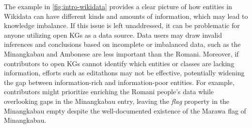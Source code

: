 The example in \autoref{fig:intro-wikidata} provides a clear picture of how entities in Wikidata can have different kinds and amounts of information, which may lead to knowledge imbalance. If this issue is left unaddressed, it can be problematic for anyone utilizing open KGs as a data source. Data users may draw invalid inferences and conclusions based on incomplete or imbalanced data, such as the Minangkabau and Ambonese are less important than the Romani. Moreover, if contributors to open KGs cannot identify which entities or classes are lacking information, efforts such as editathons may not be effective, potentially widening the gap between information-rich and information-poor entities. For example, contributors might prioritize enriching the Romani people's data while overlooking gaps in the Minangkabau entry, leaving the \textit{flag} property in the Minangkabau empty despite the well-documented existence of the Marawa flag of Minangkabau.




